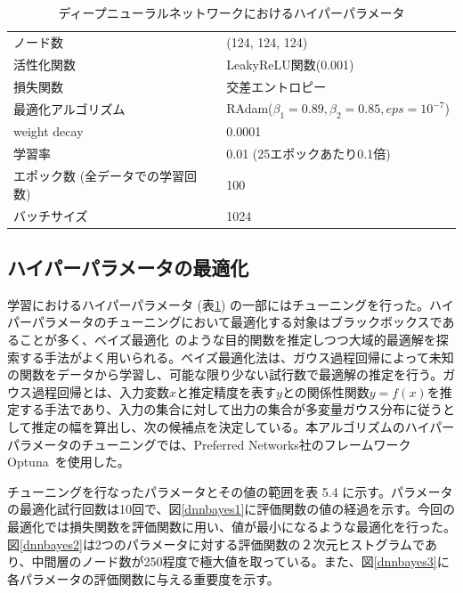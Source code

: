 \begin{table}[H]
 \centering
  \begin{tabular}{ l  l }
   \hline
   ノード数 & (124, 124, 124)\\
   活性化関数 & LeakyReLU関数(0.001)\\
   損失関数 & 交差エントロピー\\
   最適化アルゴリズム & RAdam($\beta_1 = 0.89, \beta_2 = 0.85, eps = 10^{-7}$)\\
   weight decay & 0.0001\\
   学習率 & 0.01 (25エポックあたり0.1倍)\\
   エポック数 (全データでの学習回数) & 100\\
   バッチサイズ & 1024\\
   \hline
  \end{tabular}
  \caption{ディープニューラルネットワークにおけるハイパーパラメータ}
  \label{dnnsetting}
\end{table}
\subsection{ハイパーパラメータの最適化}
学習におけるハイパーパラメータ (表\ref{dnnsetting}) の一部にはチューニングを行った。ハイパーパラメータのチューニングにおいて最適化する対象はブラックボックスであることが多く、ベイズ最適化~\cite{bayesian}のような目的関数を推定しつつ大域的最適解を探索する手法がよく用いられる。ベイズ最適化法は、ガウス過程回帰によって未知の関数をデータから学習し、可能な限り少ない試行数で最適解の推定を行う。ガウス過程回帰とは、入力変数$x$と推定精度を表す$y$との関係性関数$y = f(x)$を推定する手法であり、入力の集合に対して出力の集合が多変量ガウス分布に従うとして推定の幅を算出し、次の候補点を決定している。本アルゴリズムのハイパーパラメータのチューニングでは、Preferred Networks社のフレームワークOptuna~\cite{optuna}を使用した。

チューニングを行なったパラメータとその値の範囲を表 5.4%
に示す。パラメータの最適化試行回数は10回で、図\ref{dnnbayes1}に評価関数の値の経過を示す。今回の最適化では損失関数を評価関数に用い、値が最小になるような最適化を行った。図\ref{dnnbayes2}は2つのパラメータに対する評価関数の２次元ヒストグラムであり、中間層のノード数が250程度で極大値を取っている。また、図\ref{dnnbayes3}に各パラメータの評価関数に与える重要度を示す。

